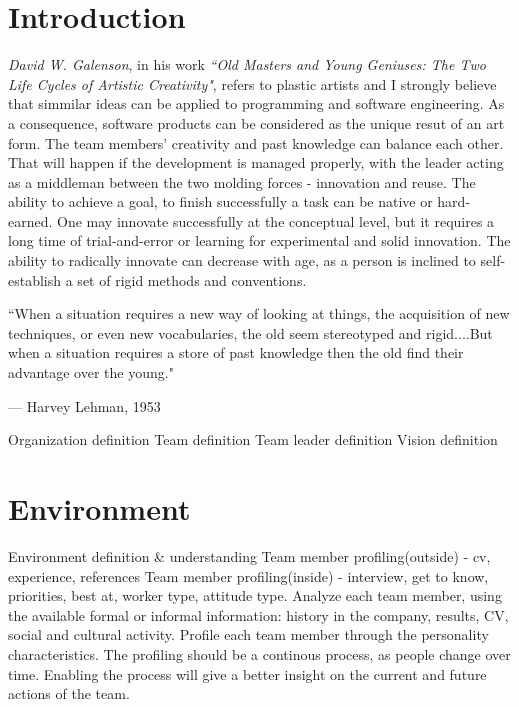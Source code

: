 \documentclass[conference]{IEEEtran}
\begin{document}
\section{Introduction}
\emph{David W. Galenson}, in his work \emph{``Old Masters and Young Geniuses: The Two Life Cycles of Artistic Creativity"}, refers to plastic artists and I strongly believe that simmilar ideas can be applied to programming and software engineering. As a consequence, software products can be considered as the unique resut of an art form. The team members' creativity and past knowledge can balance each other. That will happen if the development is managed properly, with the leader acting as a middleman between the two molding forces - innovation and reuse. 
\newline\indent
The ability to achieve a goal, to finish successfully a task can be native or hard-earned. One may innovate successfully at the conceptual level, but it requires a long time of trial-and-error or learning for experimental and solid innovation. The ability to radically innovate can decrease with age, as a person is inclined to self-establish a set of rigid methods and conventions.\cite{IEEEhowto:oldvsyoung}

\epigraph{``When a situation requires a new way of looking at things, the acquisition of new techniques, or even new vocabularies, the old seem stereotyped and rigid....But when a situation requires a store of past knowledge then the old find their advantage over the young."}{--- \textup{Harvey Lehman}, 1953
}
Organization definition
\newline\indent
Team definition
\newline\indent
Team leader definition
\newline\indent
Vision definition
\newline\indent

\section{Environment}
Environment definition \& understanding
\newline\indent
Team member profiling(outside) - cv, experience, references
\newline\indent
Team member profiling(inside) - interview, get to know, priorities, best at, worker type, attitude type. Analyze each team member, using the available formal or informal information: history in the company, results, CV, social and cultural activity. Profile each team member through the personality characteristics. The profiling should be a continous process, as people change over time. Enabling the process will give a better insight on the current and future actions of the team.
\newline\indent
\end{document}
